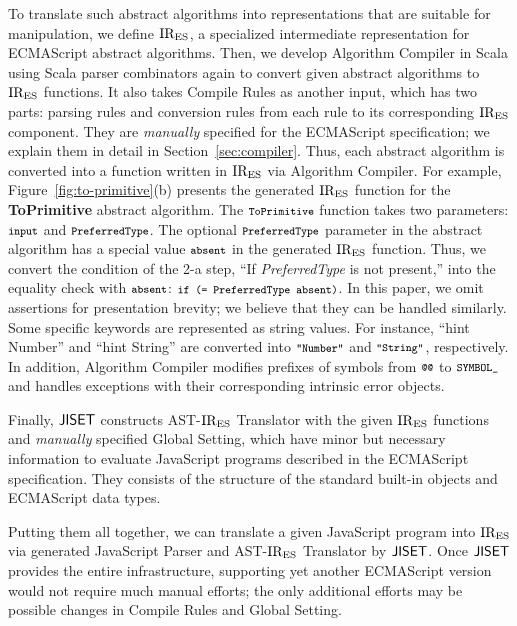 To translate such abstract algorithms into representations that are
suitable for manipulation, we define \( \text{IR}_\text{ES} \), a specialized
intermediate representation for ECMAScript abstract algorithms.  Then,
we develop \textsf{Algorithm Compiler} in Scala using Scala parser
combinators again to convert given abstract algorithms to \( \text{IR}_\text{ES} \)
functions.  It also takes \textsf{Compile Rules} as another input,
which has two parts: parsing rules and conversion rules from each rule to its
corresponding \( \text{IR}_\text{ES} \) component.  They are \textit{manually} specified for
the ECMAScript specification; we explain them in detail in
Section~\ref{sec:compiler}.  Thus, each abstract algorithm is
converted into a function written in \( \text{IR}_\text{ES} \) via \textsf{Algorithm Compiler}.
For example, Figure~\ref{fig:to-primitive}(b) presents the generated
\( \text{IR}_\text{ES} \) function for the \textbf{ToPrimitive} abstract algorithm.
The \( \texttt{\footnotesize ToPrimitive} \) function takes two parameters:
\( \texttt{\footnotesize input} \) and \( \texttt{\footnotesize PreferredType} \).  The optional
\( \texttt{\footnotesize PreferredType} \) parameter in the abstract algorithm has
a special value \( \texttt{\footnotesize absent} \) in the generated \( \text{IR}_\text{ES} \) function.
Thus, we convert the condition of the 2-a step,
``If \textit{PreferredType} is not present,'' into the equality check
with \( \texttt{\footnotesize absent} \): \( \texttt{\footnotesize if (= PreferredType absent)} \).
In this paper, we omit assertions for presentation brevity; we believe
that they can be handled similarly.  Some specific keywords are
represented as string values.  For instance, ``hint Number'' and
``hint String'' are converted into \( \texttt{\footnotesize"Number"} \) and
\( \texttt{\footnotesize"String"} \), respectively.  In addition,
\textsf{Algorithm Compiler} modifies prefixes of symbols from
\( \code{@@} \) to \( \texttt{\footnotesize SYMBOL\_} \) and handles exceptions with
their corresponding intrinsic error objects.

Finally, \( \text{\sf JISET} \) constructs {\sf AST-\( \text{IR}_\text{ES} \) Translator} with
the given \( \text{IR}_\text{ES} \) functions and \textit{manually} specified
{\sf Global Setting}, which have minor but necessary information to
evaluate JavaScript programs described in the ECMAScript specification.
They consists of the structure of the standard built-in
objects and ECMAScript data types.

Putting them all together, we can translate a given JavaScript program
into \( \text{IR}_\text{ES} \) via generated {\sf JavaScript Parser} and
{\sf AST-\( \text{IR}_\text{ES} \) Translator} by \( \text{\sf JISET} \).
Once \( \text{\sf JISET} \) provides the entire infrastructure, supporting yet
another ECMAScript version would not require much manual efforts;
the only additional efforts may be possible changes in \textsf{Compile Rules}
and {\sf Global Setting}.

